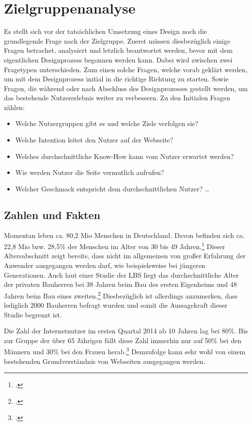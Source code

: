 \section{Zielgruppenanalyse}
Es stellt sich vor der tatsächlichen Umsetzung eines Design noch die grundlegende Frage nach der Zielgruppe. Zuerst müssen diesbezüglich einige Fragen betrachet, analysiert und letzlich beantwortet werden, bevor mit dem eigentlichen Designprozess begonnen werden kann. Dabei wird zwischen zwei Fragetypen unterschieden. Zum einen solche Fragen, welche vorab geklärt werden, um mit dem Designprozess initial in die richtige Richtung zu starten. Sowie Fragen, die während oder nach Abschluss des Designprozesses gestellt werden, um das bestehende Nutzererlebnis weiter zu verbessern.
Zu den Initialen Fragen zählen: 
\begin{itemize}
	\item Welche Nutzergruppen gibt es und welche Ziele verfolgen sie?
	\item Welche Intention leitet den Nutzer auf der Webseite?
	\item Welches durchschnittliche Know-How kann vom Nutzer erwartet werden? 
	\item Wie werden Nutzer die Seite vermutlich aufrufen? 
	\item Welcher Geschmack entspricht dem durchschnittlichen Nutzer? \ldots
\end{itemize}
\subsection{Zahlen und Fakten}
Momentan leben ca. 80,2 Mio Menschen in Deutschland. Davon befinden sich ca. 22,8 Mio bzw. 28,5\% der Menschen im Alter von 30 bis 49 Jahren.\footcite[vgl.][]{zensus2011:alter} Dieser Altersabschnitt zeigt bereits, dass nicht im allgemeinen von großer Erfahrung der Anwender ausgegangen werden darf, wie beispielsweise bei jüngeren Generationen. Auch laut einer Studie der LBS liegt das durchschnittliche Alter der privaten Bauherren bei 38 Jahren beim Bau des ersten Eigenheims und 48 Jahren beim Bau eines zweiten.\footcite[vgl.][]{lbs} Diesbezüglich ist allerdings anzumerken, dass lediglich 2000 Bauherren befragt wurden und somit die Aussagekraft dieser Studie begrenzt ist.

Die Zahl der Internetnutzer im ersten Quartal 2014 ab 10 Jahren lag bei 80\%. Bis zur Gruppe der über 65 Jährigen fällt diese Zahl immerhin nur auf 50\% bei den Männern und 30\% bei den Frauen herab.\footcite[vgl.][]{stabu} Demzufolge kann sehr wohl von einem bestehenden Grundverständnis von Webseiten ausgegangen werden. 

